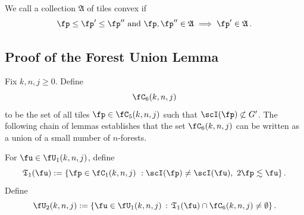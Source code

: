










We call a collection $\mathfrak{A}$ of tiles convex if
\begin{equation}
    \label{eq-convexity}
    \fp \le \fp' \le \fp'' \ \text{and} \ \fp, \fp'' \in \mathfrak{A} \implies \fp' \in \mathfrak{A}\,.
\end{equation}



























\subsection{Proof of the Forest Union Lemma}
\label{subsecforest}

Fix $k,n,j\ge 0$.
Define
$$
    \fC_6(k,n,j)
$$
to be the set of all tiles $\fp \in \fC_5(k,n,j)$ such that $\scI(\fp) \not\subset G'$. The following chain of lemmas
establishes that the set $\fC_6(k,n,j)$ can be written as a union of a small number of $n$-forests.

For $\fu\in \fU_1(k,n,j)$, define
\begin{equation}
    \label{eq-T1-def}
    \mathfrak{T}_1(\fu):= \{\fp \in \fC_1(k,n,j) \ : \scI(\fp)\neq \scI(\fu), \ 2\fp \lesssim \fu\}\,.
\end{equation}
Define
\begin{equation}
    \label{eq-U2-def}
    \fU_2(k,n,j) := \{ \fu \in \fU_1(k,n,j) \, : \, \mathfrak{T}_1(\fu) \cap \fC_6(k,n,j) \ne \emptyset\}\,.
\end{equation}

